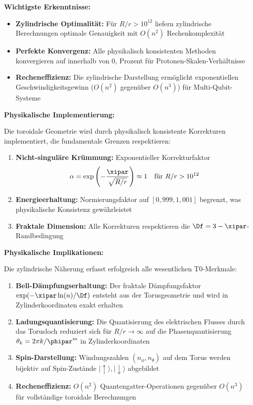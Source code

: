 \textbf{Wichtigste Erkenntnisse:}
\begin{itemize}
	\item \textbf{Zylindrische Optimalität:} Für $R/r > 10^{12}$ liefern zylindrische Berechnungen 
	optimale Genauigkeit mit $O(n^2)$ Rechenkomplexität
	\item \textbf{Perfekte Konvergenz:} Alle physikalisch konsistenten Methoden konvergieren 
	auf innerhalb von 0, Prozent für Protonen-Skalen-Verhältnisse
	\item \textbf{Recheneffizienz:} Die zylindrische Darstellung ermöglicht exponentiellen 
	Geschwindigkeitsgewinn ($O(n^2)$ gegenüber $O(n^3)$) für Multi-Qubit-Systeme
\end{itemize}

\textbf{Physikalische Implementierung:}

Die toroidale Geometrie wird durch physikalisch konsistente Korrekturen 
implementiert, die fundamentale Grenzen respektieren:

\begin{enumerate}
	\item \textbf{Nicht-singuläre Krümmung:} Exponentieller Korrekturfaktor 
	\[
	\alpha = \exp\left(-\frac{\xipar}{\sqrt{R/r}}\right) \approx 1 \quad \text{für } R/r > 10^{12}
	\]
	
	\item \textbf{Energieerhaltung:} Normierungsfaktor auf $[0,\!999, 1,\!001]$ begrenzt, 
	was physikalische Konsistenz gewährleistet
	
	\item \textbf{Fraktale Dimension:} Alle Korrekturen respektieren die $\Df = 3 - \xipar$-Randbedingung
\end{enumerate}

\textbf{Physikalische Implikationen:}

Die zylindrische Näherung erfasst erfolgreich alle wesentlichen T0-Merkmale:

\begin{enumerate}
	\item \textbf{Bell-Dämpfungserhaltung:} Der fraktale Dämpfungsfaktor 
	$\exp(-\xipar\ln(n)/\Df)$ entsteht aus der Torusgeometrie und wird in 
	Zylinderkoordinaten exakt erhalten
	
	\item \textbf{Ladungsquantisierung:} Die Quantisierung des elektrischen Flusses 
	durch das Torusloch reduziert sich für $R/r \to \infty$ auf die Phasenquantisierung 
	$\theta_k = 2\pi k / \phipar^m$ in Zylinderkoordinaten
	
	\item \textbf{Spin-Darstellung:} Windungszahlen $(n_\phi, n_\theta)$ auf dem 
	Torus werden bijektiv auf Spin-Zustände $|\uparrow\rangle, |\downarrow\rangle$ abgebildet
	
	\item \textbf{Recheneffizienz:} $O(n^2)$ Quantengatter-Operationen gegenüber 
	$O(n^3)$ für vollständige toroidale Berechnungen
\end{enumerate}

